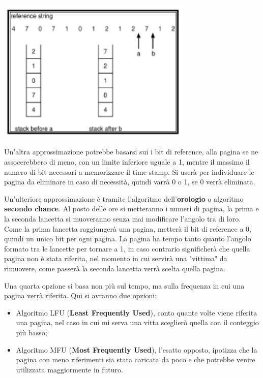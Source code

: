 \documentclass[a4paper, 12pt]{book}
\begin{document}
\begin{center}
    \includegraphics[width=0.7\textwidth]{LRU_approx.png}
\end{center}

Un'altra approssimazione potrebbe basarsi sui i bit di reference, alla pagina se ne assocerebbero di meno, con un limite inferiore 
uguale a 1, mentre il massimo il numero di bit necessari a memorizzare il time stamp. Si userà per individuare le pagina da eliminare
in caso di necessità, quindi varrà 0 o 1, se 0 verrà eliminata.

Un'ulteriore approssimazione è tramite l'algoritmo dell'\textbf{orologio} o algoritmo \textbf{secondo chance}. Al posto delle ore 
si metteranno i numeri di pagina, la prima e la seconda lancetta si muoveranno senza mai modificare l'angolo tra di loro. Come 
la prima lancetta raggiungerà una pagina, metterà il bit di reference a 0, quindi un unico bit per ogni pagina. La pagina ha tempo 
tanto quanto l'angolo formato tra le lancette per tornare a 1, in caso contrario significherà che quella pagina non è stata riferita,
nel momento in cui servirà una "vittima" da rimuovere, come passerà la seconda lancetta verrà scelta quella pagina.

Una quarta opzione si basa non più sul tempo, ma sulla frequenza in cui una pagina verrà riferita. Qui si avranno due opzioni:
\begin{itemize}
    \item Algoritmo LFU (\textbf{Least Frequently Used}), conto quante volte viene riferita una pagina, nel caso in cui mi serva 
    una vitta sceglierò quella con il conteggio più basso;
    \item Algoritmo MFU (\textbf{Most Frequently Used}), l'esatto opposto, ipotizza che la pagina con meno riferimenti sia stata 
    caricata da poco e che potrebbe venire utilizzata maggiormente in futuro.
\end{itemize}
\end{document}
